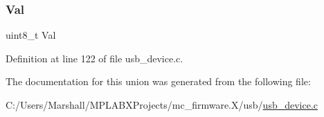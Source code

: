 \mbox{\label{unionuint8__t___v_a_l_aa0c179f4462bb12ca1ed40d18c89cda1}} 
\subsubsection{\texorpdfstring{Val}{Val}}
{\footnotesize\ttfamily uint8\+\_\+t Val}



Definition at line 122 of file usb\+\_\+device.\+c.



The documentation for this union was generated from the following file\+:\begin{DoxyCompactItemize}
\item 
C\+:/\+Users/\+Marshall/\+M\+P\+L\+A\+B\+X\+Projects/mc\+\_\+firmware.\+X/usb/\mbox{\hyperlink{usb__device_8c}{usb\+\_\+device.\+c}}\end{DoxyCompactItemize}
